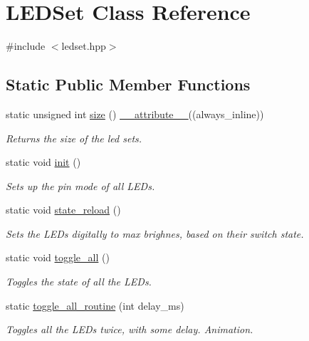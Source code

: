 \hypertarget{classLEDSet}{}\section{L\+E\+D\+Set Class Reference}
\label{classLEDSet}


{\ttfamily \#include $<$ledset.\+hpp$>$}

\subsection*{Static Public Member Functions}
\begin{DoxyCompactItemize}
\item 
static unsigned int \hyperlink{classLEDSet_a090860287fc0ce0d09e2b3c6d4399005}{size} () \hyperlink{utilities_8hpp_a103d5b3998e0dd804213c8f30a094f4d}{\+\_\+\+\_\+attribute\+\_\+\+\_\+}((always\+\_\+inline))
\begin{DoxyCompactList}\small\item\em Returns the size of the led sets. \end{DoxyCompactList}\item 
static void \hyperlink{classLEDSet_aebc268353f21afffcf0a80c92b6444d2}{init} ()
\begin{DoxyCompactList}\small\item\em Sets up the pin mode of all L\+E\+Ds. \end{DoxyCompactList}\item 
static void \hyperlink{classLEDSet_a1cb98a2a56113493121873f294dbd35a}{state\+\_\+reload} ()
\begin{DoxyCompactList}\small\item\em Sets the L\+E\+Ds digitally to max brighnes, based on their switch state. \end{DoxyCompactList}\item 
static void \hyperlink{classLEDSet_aec21832638aa78f34f1ff5b4133b5620}{toggle\+\_\+all} ()
\begin{DoxyCompactList}\small\item\em Toggles the state of all the L\+E\+Ds. \end{DoxyCompactList}\item 
static \hyperlink{classLEDSet_acf2788af34b7aebec813665763256d54}{toggle\+\_\+all\+\_\+routine} (int delay\+\_\+ms)
\begin{DoxyCompactList}\small\item\em Toggles all the L\+E\+Ds twice, with some delay.  Animation. \end{DoxyCompactList}\item 

\end{DoxyCompactItemize}
